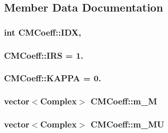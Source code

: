 \subsection{Member Data Documentation}
\hypertarget{classCMCoeff_ab1882e6a0df777b1acffadf55844dc92}{
\subsubsection[{I\-D\-X}]{\setlength{\rightskip}{0pt plus 5cm}int C\-M\-Coeff\-::\-I\-D\-X\hspace{0.3cm}{\ttfamily [static]}, {\ttfamily [protected]}}}\label{classCMCoeff_ab1882e6a0df777b1acffadf55844dc92}
\hypertarget{classCMCoeff_a7e893ff6deb29f85472663fffd995f42}{
\subsubsection[{I\-R\-S}]{ C\-M\-Coeff\-::\-I\-R\-S = 1.\hspace{0.3cm}{\ttfamily [static]}}}\label{classCMCoeff_a7e893ff6deb29f85472663fffd995f42}
\hypertarget{classCMCoeff_a468f6af1ba4ddbe13561217488c87b40}{
\subsubsection[{K\-A\-P\-P\-A}]{ C\-M\-Coeff\-::\-K\-A\-P\-P\-A = 0.\hspace{0.3cm}{\ttfamily [static]}}}\label{classCMCoeff_a468f6af1ba4ddbe13561217488c87b40}
\hypertarget{classCMCoeff_a15347641cc66b95ff56bea89f4585edf}{
\subsubsection[{m\-\_\-\-M}]{\setlength{\rightskip}{0pt plus 5cm}vector$<${\bf Complex}$>$ C\-M\-Coeff\-::m\-\_\-\-M\hspace{0.3cm}{\ttfamily [protected]}}}\label{classCMCoeff_a15347641cc66b95ff56bea89f4585edf}
\hypertarget{classCMCoeff_a2fc4617b2a37d2ca033aea2f5e02b5de}{
\subsubsection[{m\-\_\-\-M\-U}]{\setlength{\rightskip}{0pt plus 5cm}vector$<${\bf Complex}$>$ C\-M\-Coeff\-::m\-\_\-\-M\-U\hspace{0.3cm}{\ttfamily [protected]}}}\label{classCMCoeff_a2fc4617b2a37d2ca033aea2f5e02b5de}
